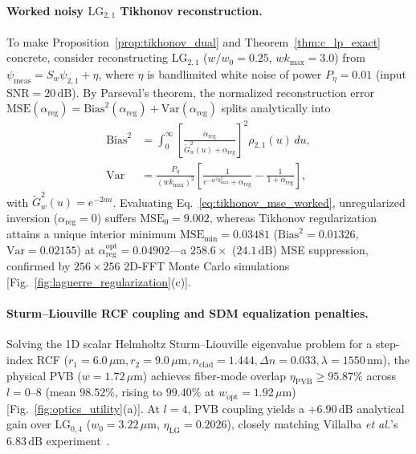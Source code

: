 \documentclass[aps,pra,reprint,amsmath,amssymb,floatfix,longbibliography]{revtex4-2}
\begin{document}
\paragraph*{Worked noisy $\mathrm{LG}_{2,1}$ Tikhonov reconstruction.}
To make Proposition~\ref{prop:tikhonov_dual} and Theorem~\ref{thm:c_lp_exact} concrete, consider reconstructing $\mathrm{LG}_{2,1}$ ($w/w_0 = 0.25$, $w k_{\max} = 3.0$) from $\psi_{\mathrm{meas}} = S_w\psi_{2,1} + \eta$, where $\eta$ is bandlimited white noise of power $P_\eta = 0.01$ (input $\mathrm{SNR} = 20\,\mathrm{dB}$). By Parseval's theorem, the normalized reconstruction error $\mathrm{MSE}(\alpha_{\mathrm{reg}}) = \mathrm{Bias}^2(\alpha_{\mathrm{reg}}) + \mathrm{Var}(\alpha_{\mathrm{reg}})$ splits analytically into
\begin{align}
\mathrm{Bias}^2 &= \int_0^\infty \left[\frac{\alpha_{\mathrm{reg}}}{\widetilde{G}_w^2(u) + \alpha_{\mathrm{reg}}}\right]^2 \rho_{2,1}(u)\,du, \nonumber \\
\mathrm{Var} &= \frac{P_\eta}{(w k_{\max})^2}\left[\frac{1}{e^{-w^2 k_{\max}^2}+\alpha_{\mathrm{reg}}} - \frac{1}{1+\alpha_{\mathrm{reg}}}\right],
\label{eq:tikhonov_mse_worked}
\end{align}
with $\widetilde{G}_w^2(u) = e^{-2a u}$. Evaluating Eq.~\eqref{eq:tikhonov_mse_worked}, unregularized inversion ($\alpha_{\mathrm{reg}} = 0$) suffers $\mathrm{MSE}_0 = 9.002$, whereas Tikhonov regularization attains a unique interior minimum $\mathrm{MSE}_{\min} = 0.03481$ ($\mathrm{Bias}^2 = 0.01326$, $\mathrm{Var} = 0.02155$) at $\alpha_{\mathrm{reg}}^{\mathrm{opt}} = 0.04902$—a $258.6\times$ ($24.1\,\mathrm{dB}$) MSE suppression, confirmed by $256\times 256$ 2D-FFT Monte Carlo simulations [Fig.~\ref{fig:laguerre_regularization}(c)].

\paragraph*{Sturm--Liouville RCF coupling and SDM equalization penalties.}
Solving the 1D scalar Helmholtz Sturm--Liouville eigenvalue problem for a step-index RCF ($r_1 = 6.0\,\mu\mathrm{m}, r_2 = 9.0\,\mu\mathrm{m}, n_{\mathrm{clad}} = 1.444, \Delta n = 0.033, \lambda = 1550\,\mathrm{nm}$), the physical PVB ($w = 1.72\,\mu\mathrm{m}$) achieves fiber-mode overlap $\eta_{\mathrm{PVB}} \ge 95.87\%$ across $l=0\text{--}8$ (mean $98.52\%$, rising to $99.40\%$ at $w_{\mathrm{opt}} = 1.92\,\mu\mathrm{m}$) [Fig.~\ref{fig:optics_utility}(a)]. At $l=4$, PVB coupling yields a $+6.90\,\mathrm{dB}$ analytical gain over $\mathrm{LG}_{0,4}$ ($w_0 = 3.22\,\mu\mathrm{m}$, $\eta_{\mathrm{LG}} = 0.2026$), closely matching Villalba \emph{et al.}'s $6.83\,\mathrm{dB}$ experiment~\cite{Villalba2023}.
\end{document}
